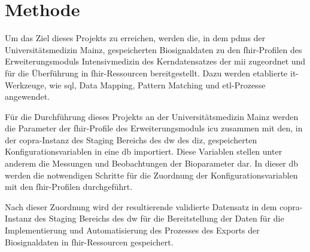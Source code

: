 \chapter{Methode} \label{ch:methods}

Um das Ziel dieses Projekts zu erreichen, werden die, in dem \ac{pdms} der Universitätsmedizin Mainz, gespeicherten Biosignaldaten zu den \ac{fhir}-Profilen des Erweiterungsmoduls \glqq Intensivmedizin\grqq{} des Kerndatensatzes der \ac{mii} zugeordnet und für die Überführung in \ac{fhir}-Ressourcen bereitgestellt. Dazu werden etablierte \ac{it}-Werkzeuge, wie \ac{sql}, Data Mapping, Pattern Matching und \ac{etl}-Prozesse angewendet.

Für die Durchführung dieses Projekts an der Universitätsmedizin Mainz werden die Parameter der \ac{fhir}-Profile des Erweiterungsmoduls \ac{icu} zusammen mit den, in der \ac{copra}-Instanz des Staging Bereichs des \ac{dw} des \ac{diz}, gespeicherten Konfigurationsvariablen in eine \ac{db} importiert. Diese Variablen stellen unter anderem die Messungen und Beobachtungen der Bioparameter dar. In dieser \ac{db} werden die notwendigen Schritte für die Zuordnung der Konfigurationsvariablen mit den \ac{fhir}-Profilen durchgeführt. 

Nach dieser Zuordnung wird der resultierende validierte Datensatz in dem \ac{copra}-Instanz des Staging Bereichs des \ac{dw} für die Bereitstellung der Daten für die Implementierung und Automatisierung des Prozesses des Exports der Biosignaldaten in \ac{fhir}-Ressourcen gespeichert.